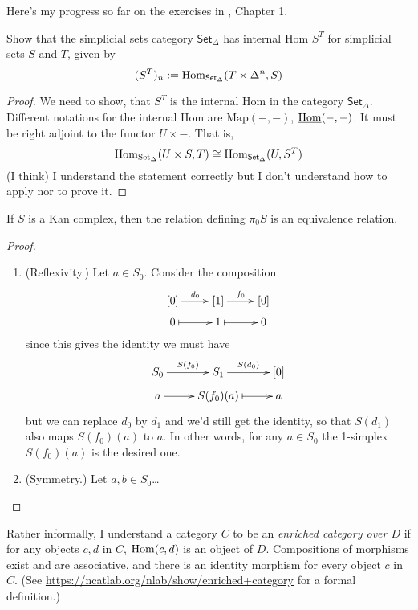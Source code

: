 Here's my progress so far on the exercises in \cite{Rune}, Chapter 1.

\begin{exercise}[Observation 1.4.7]
\label{exercise-simplicial-sets-category-has-internal-Hom}
Show that the simplicial sets category  $\mathsf{Set}_\Delta$ has internal 
Hom $S^T$ for simplicial sets $S$ and $T$, given by
$$
(S^T)_n:=\mathop{\mathrm{Hom}}\nolimits_{\mathsf{Set}_\Delta}(T\times\Delta^n,S)
$$
\end{exercise}

\begin{proof}
We need to show, that $S^T$ is the internal Hom in the category
$\mathsf{Set}_\Delta$. Different notations for the internal Hom
are $\text{Map}(-,-)$, $\underline{\mathop{\mathrm{Hom}}\nolimits}(-,-)$.
It must be right adjoint to 
the functor $U \times -$.
That is,
$$
\mathop{\mathrm{Hom}}\nolimits_{\text{Set}_\Delta}(U \times S,T)\cong\mathop{\mathrm{Hom}}\nolimits_{\mathsf{Set}_\Delta}(U,S^T)
$$
(I think) I understand the statement correctly
but I don't understand how to apply
\cite[Theorem 1.1.10 (Kan)]{Cisinsky} nor \cite[Remark 1.1.11]{Cisinsky}
to prove it.


\end{proof}

\begin{exercise}[1.1]
\label{exercise-relation-is-equivalence-relation}
If $S$ is a Kan complex, then the relation defining
$\pi_0S$ is an equivalence relation.
\end{exercise}

\begin{proof}
\begin{enumerate}
\item (Reflexivity.) Let $a \in S_0$. Consider the composition
$$
\xymatrixrowsep{0.5em}
\xymatrix{
[0]\ar[r]^{d_0}& [1]\ar[r]^{f_0}& [0]\\
0\ar@{|->}[r]& 1\ar@{|->}[r]&0
}
$$
since this gives the identity we must have
$$
\xymatrixrowsep{0.5em}
\xymatrix{
S_0\ar[r]^{S(f_0)}& S_1\ar[r]^{S(d_0)}& [0]\\
a\ar@{|->}[r]& S(f_0)(a)\ar@{|->}[r]&a
}
$$
but we can replace $d_0$ by $d_1$ and we'd still get the identity,
so that $S(d_1)$ also maps $S(f_0)(a)$ to $a$. In other words, 
for any  $a \in S_0$ the 1-simplex $S(f_0)(a)$ is the desired one.
\item (Symmetry.) Let $a,b \in S_0$…
\end{enumerate}
\end{proof}

Rather informally, I understand a category $C$ to be
an {\it enriched category over $D$} if for any objects
$c,d$ in $C$, $\mathop{\mathrm{Hom}}\nolimits(c,d)$ is an object of $D$.
Compositions of morphisms exist and are associative,
and there is an identity morphism for every object $c$ in $C$.
(See \url{https://ncatlab.org/nlab/show/enriched+category} 
for a formal definition.)

